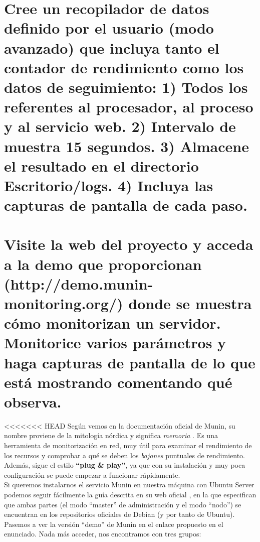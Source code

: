\section{Cree un recopilador de datos definido por el usuario (modo avanzado) que incluya tanto el contador de rendimiento como los datos de seguimiento: 1) Todos los referentes al procesador, al proceso y al servicio web. 2) Intervalo de muestra 15 segundos. 3) Almacene el resultado en el directorio Escritorio/logs. 4) Incluya las capturas de pantalla de cada paso.}

\section{Visite la web del proyecto y acceda a la demo que proporcionan (http://demo.munin-monitoring.org/) donde se muestra cómo monitorizan un servidor. Monitorice varios parámetros y haga capturas de pantalla de lo que está mostrando comentando qué observa.}
<<<<<<< HEAD
Según vemos en la documentación oficial de Munin, su nombre proviene de la mitología nórdica y significa \emph{memoria} \cite{munin-info}. Es una herramienta de monitorización en red, muy útil para examinar el rendimiento de los recursos y comprobar a qué se deben los \emph{bajones} puntuales de rendimiento. Además, sigue el estilo \textbf{``plug \& play''}, ya que con su instalación y muy poca configuración se puede empezar a funcionar rápidamente. \\
Si queremos instalarnos el servicio Munin en nuestra máquina con Ubuntu Server podemos seguir fácilmente la guía descrita en su web oficial \cite{munin-install}, en la que especifican que ambas partes (el modo ``master'' de administración y el modo ``nodo'') se encuentran en los repositorios oficiales de Debian (y por tanto de Ubuntu). \\
Pasemos a ver la versión ``demo'' de Munin en el enlace propuesto en el enunciado. Nada más acceder, nos encontramos con tres grupos:
